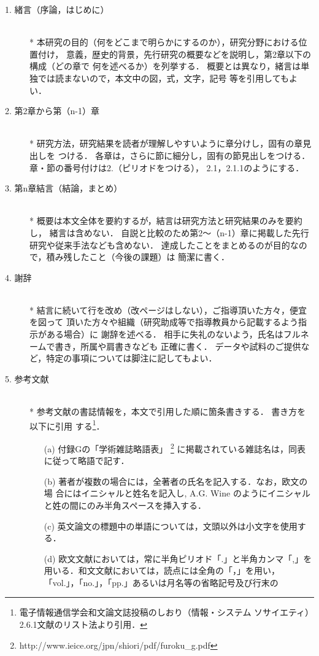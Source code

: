 \documentclass[main]{subfiles}
\begin{document}
\begin{description}
\item[1. 緒言（序論，はじめに）] 　\\*
本研究の目的（何をどこまで明らかにするのか），研究分野における位置付け，
意義，歴史的背景，先行研究の概要などを説明し，第2章以下の構成（どの章で
何を述べるか）を列挙する．
概要とは異なり，緒言は単独では読まないので，本文中の図，式，文字，記号
等を引用してもよい．
\item[2. 第2章から第（n-1）章] 　\\*
研究方法，研究結果を読者が理解しやすいように章分けし，固有の章見出しを
つける．
各章は，さらに節に細分し，固有の節見出しをつける．
章・節の番号付けは2.（ピリオドをつける）， 2.1，2.1.1のようにする．
\item[3. 第n章結言（結論，まとめ）] 　\\*
概要は本文全体を要約するが，結言は研究方法と研究結果のみを要約し，
緒言は含めない．
自説と比較のため第2〜（n-1）章に掲載した先行研究や従来手法なども含めない．
達成したことをまとめるのが目的なので，積み残したこと（今後の課題）は
簡潔に書く．
\item[4. 謝辞] 　\\*
結言に続いて行を改め（改ページはしない），ご指導頂いた方々，便宜を図って
頂いた方々や組織（研究助成等で指導教員から記載するよう指示がある場合）に
謝辞を述べる．
相手に失礼のないよう，氏名はフルネームで書き，所属や肩書きなども
正確に書く．
データや試料のご提供など，特定の事項については脚注に記してもよい．
\item[5. 参考文献] 　\\*
参考文献の書誌情報を，本文で引用した順に箇条書きする．
書き方を以下に引用
する\footnote{電子情報通信学会和文論文誌投稿のしおり（情報・システム
ソサイエティ） 2.6.1文献のリスト法より引用．}．
\begin{itemize}
\item[(a)] 付録Gの「学術雑誌略語表」
	   \footnote{http://www.ieice.org/jpn/shiori/pdf/furoku\_g.pdf}
	   に掲載されている雑誌名は，同表に従って略語で記す．
\item[(b)] 著者が複数の場合には，全著者の氏名を記入する．なお，欧文の場
	   合にはイニシャルと姓名を記入し, A.G. Wine のようにイニシャル
	   と姓の間にのみ半角スペースを挿入する．
\item[(c)] 英文論文の標題中の単語については，文頭以外は小文字を使用する．
\item[(d)] 欧文文献においては，常に半角ピリオド「.」と半角カンマ「,」を
	   用いる．和文文献においては，読点には全角の「，」を用い，
	   「vol.」，「no.」，「pp.」あるいは月名等の省略記号及び行末の

\end{itemize}
\end{description}
\end{document}
